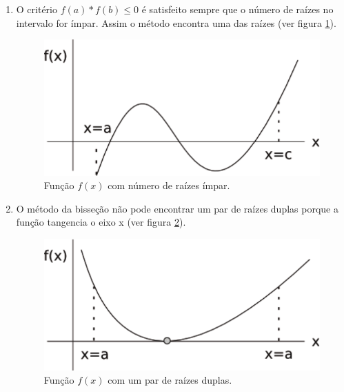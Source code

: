 \begin{enumerate}
 \item O critério $f(a) \ast f(b) \leq 0$ é satisfeito sempre que o número de raízes no intervalo for ímpar. Assim o método encontra uma das raízes (ver figura \ref{fig:bissecao2}).

\begin{figure}[htb]
  \setlength{\abovecaptionskip}{20pt}
  \centering
  \includegraphics[scale=0.8]{capitulos/capitulo1/figuras/bissecao2-eps-converted-to.pdf}
  \caption{Função $f(x)$ com número de raízes ímpar.}
  \label{fig:bissecao2}
\end{figure}

\item O método da bisseção não pode encontrar um par de raízes duplas porque a função tangencia o eixo x (ver figura \ref{fig:bissecao3}).

\begin{figure}[htb]
  \setlength{\abovecaptionskip}{20pt}
  \centering
  \includegraphics[scale=0.8]{capitulos/capitulo1/figuras/bissecao3-eps-converted-to.pdf}
  \caption{Função $f(x)$ com um par de raízes duplas.}
  \label{fig:bissecao3}
\end{figure}


\end{enumerate}
